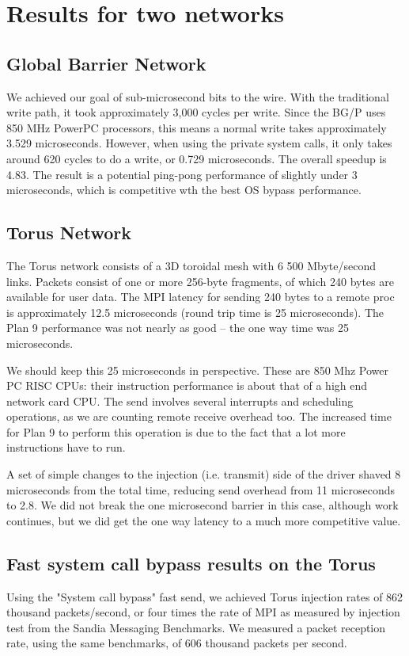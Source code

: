\documentclass[letterpaper,twocolumn,10pt]{article}
\begin{document}
\section{Results for two networks}
\subsection{Global Barrier Network}
We achieved our goal of sub-microsecond bits to the wire. With the traditional write path, it took approximately 3,000 cycles per write. Since the BG/P uses 850 MHz PowerPC processors, this means a normal write takes approximately 3.529 microseconds. However, when using the private system calls, it only takes around 620 cycles to do a write, or 0.729 microseconds. The overall speedup is 4.83. 
The result is a potential ping-pong performance of slightly under 3 microseconds, which is competitive wth the best OS bypass performance. 

\subsection{Torus Network}
The Torus network consists of a 3D toroidal mesh with 6 500 Mbyte/second links. Packets consist of one or more 
256-byte fragments, of which 240 bytes are available for user data. The MPI latency for sending 240  bytes to a remote 
proc is approximately 12.5 microseconds (round trip time is 25 microseconds). The Plan 9 performance was not nearly as good -- the one way time was 25 microseconds. 

We should keep this 25 microseconds in perspective. These are 850 Mhz Power PC RISC CPUs: 
their instruction performance is about that of a high end network card CPU. The send involves several interrupts and scheduling operations, as we are counting remote receive overhead too. The increased time for Plan 9 
to perform this operation is due to the fact that a lot more instructions have to run. 

A set of simple changes to the injection (i.e. transmit) side of the driver shaved 8 microseconds from the total time, 
reducing send overhead from 11 microseconds to 2.8. We did not break the one microsecond barrier in this case, although work continues, but we did get the one way latency to a much more competitive value.

\subsection{Fast system call bypass results on the Torus}
Using the "System call bypass"  fast send, we achieved Torus injection rates of 862 thousand packets/second, or four times the rate of MPI as measured by injection test from the Sandia Messaging Benchmarks\cite{barrett2009application}. 
We measured a packet reception rate, using the same benchmarks, of 
606 thousand packets
per second. 
\end{document}
